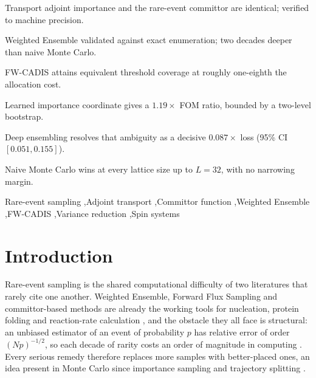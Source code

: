 \documentclass[a4paper,fleqn]{cas-sc}
\begin{document}
	\begin{highlights}
		\item Transport adjoint importance and the rare-event committor are identical; verified to machine precision.
		\item Weighted Ensemble validated against exact enumeration; two decades deeper than naive Monte Carlo.
		\item FW-CADIS attains equivalent threshold coverage at roughly one-eighth the allocation cost.
		\item Learned importance coordinate gives a $1.19\times$ FOM ratio, bounded by a two-level bootstrap.
		\item Deep ensembling resolves that ambiguity as a decisive $0.087\times$ loss (95\% CI $[0.051,0.155]$).
		\item Naive Monte Carlo wins at every lattice size up to $L=32$, with no narrowing margin.
	\end{highlights}
	
	\begin{keywords}
		Rare-event sampling \sep Adjoint transport \sep Committor function \sep Weighted Ensemble \sep FW-CADIS \sep Variance reduction \sep Spin systems
	\end{keywords}
	
	\maketitle
	
	\section{Introduction}\label{sec:intro}
	Rare-event sampling is the shared computational difficulty of two literatures that rarely
	cite one another. Weighted Ensemble, Forward Flux Sampling and committor-based methods are
	already the working tools for nucleation, protein folding and reaction-rate calculation
	\cite{allen2009, zuckerman2017, e2006}, and the obstacle they all face is structural: an
	unbiased estimator of an event of probability $p$ has relative error of order $(Np)^{-1/2}$,
	so each decade of rarity costs an order of magnitude in computing
	\cite{allen2009, touchette2009}. Every serious remedy therefore replaces more samples with
	better-placed ones, an idea present in Monte Carlo since importance sampling and trajectory
	splitting \cite{kahn1951, kahn1953}.
	
\end{document}
